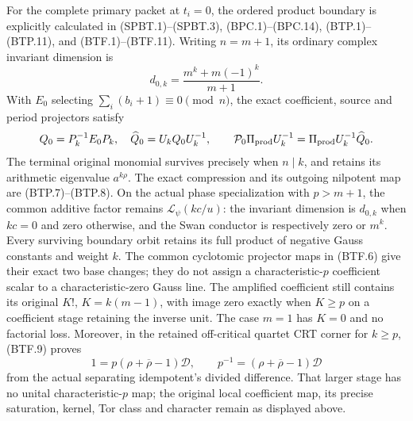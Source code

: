 For the complete primary packet at \(t_i=0\), the ordered
product boundary is explicitly calculated in
(SPBT.1)--(SPBT.3), (BPC.1)--(BPC.14),
(BTP.1)--(BTP.11), and (BTF.1)--(BTF.11).
Writing \(n=m+1\), its ordinary complex invariant dimension is
\[
 d_{0,k}=\frac{m^k+m(-1)^k}{m+1}.
\]
With \(E_0\) selecting \(\sum_i(b_i+1)\equiv0\pmod n\),
the exact coefficient, source and period projectors satisfy
\[
 Q_0=P_k^{-1}E_0P_k,\quad
 \widehat Q_0=U_kQ_0U_k^{-1},\qquad
 \mathcal P_0\Pi_{\rm prod}U_k^{-1}
       =\Pi_{\rm prod}U_k^{-1}\widehat Q_0.
\]
The terminal original monomial survives precisely when
\(n\mid k\), and retains its arithmetic eigenvalue
\(a^{k\rho}\).  The exact compression and its outgoing
nilpotent map are (BTP.7)--(BTP.8).
On the actual phase specialization with \(p>m+1\), the
common additive factor remains \(\mathcal L_\psi(kc/u)\):
the invariant dimension is \(d_{0,k}\) when \(kc=0\) and
zero otherwise, and the Swan conductor is respectively zero
or \(m^k\).  Every surviving boundary orbit retains its full
product of negative Gauss constants and weight \(k\).
The common cyclotomic projector maps in (BTF.6) give their
exact two base changes; they do not assign a characteristic-\(p\)
coefficient scalar to a characteristic-zero Gauss line.
The amplified coefficient still contains its original \(K!\),
\(K=k(m-1)\), with image zero exactly when \(K\ge p\)
on a coefficient stage retaining the inverse unit.
The case \(m=1\) has \(K=0\) and no factorial loss.
Moreover, in the retained off-critical quartet CRT corner
for \(k\ge p\), (BTF.9) proves
\[
 1=p(\rho+\overline\rho-1)\mathscr D,\qquad
 p^{-1}=(\rho+\overline\rho-1)\mathscr D
\]
from the actual separating idempotent's divided difference.
That larger stage has no unital characteristic-\(p\) map;
the original local coefficient map, its precise saturation,
kernel, Tor class and character remain as displayed above.

